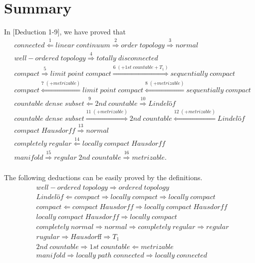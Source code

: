 \documentclass[11pt]{diazessay} %
\begin{document}

\section*{Summary}

In [Deduction 1-9], we have proved that
$$
\begin{aligned}
&	connected \overset{1}{\Longleftarrow} linear \; continuum \overset{2}{\Longrightarrow} order \; topology \overset{3}{\Longrightarrow} normal
\\
&	well-ordered \; topology \overset{4}{\Longrightarrow} totally \; disconnected
\\
&	compact \overset{5}{\Longrightarrow} limit \; point \; compact \overset{6\; (+1st\; countable + T_1)}{\Longrightarrow} sequentially \; compact 
\\
&	compact \overset{7\; (+metrizable)}{\Longleftarrow} limit \; point \; compact \overset{8\; (+metrizable)}{\Longleftarrow} sequentially \; compact 
\\
&	countable \; dense \; subset \overset{9}{\Longleftarrow} 2nd \; countable \overset{10}{\Longrightarrow} Lindel\textit{ö}f
\\
&	countable \; dense \; subset \overset{11\; (+metrizable)}{\Longrightarrow} 2nd \; countable \overset{12\; (+metrizable)}{\Longleftarrow} Lindel\textit{ö}f
\\
&	compact \; Hausdorff \overset{13}{\Longrightarrow} normal 
\\
&	completely \; regular \overset{14}{\Longleftarrow} locally \; compact \; Hausdorff
\\
&	manifold \overset{15}{\Longrightarrow} regular \; 2nd \; countable \overset{16}{\Longrightarrow} metrizable.\\
\end{aligned}
$$

\vskip 10pt
The following deductions can be easily proved by the definitions.
$$
\begin{aligned}
&well-ordered \; topology \overset{~}{\Longrightarrow} ordered \; topology\\
&Lindel\textit{ö}f \overset{~}{\Longleftarrow} compact \overset{~}{\Longrightarrow} locally \; compact \overset{~}{\Longrightarrow} locally \; compact\\
&compact \overset{~}{\Longleftarrow} compact \; Hausdorff \overset{~}{\Longrightarrow} locally \; compact \; Hausdorff \\
&locally \; compact \; Hausdorff \overset{~}{\Longrightarrow} locally \; compact\\
&completely \; normal \overset{~}{\Longrightarrow} normal \overset{~}{\Longrightarrow} completely \; regular \overset{~}{\Longrightarrow} regular\\
&rugular \overset{~}{\Longrightarrow} Hausdorﬀ \overset{~}{\Longrightarrow} T_1\\
&2nd \; countable \overset{~}{\Longrightarrow} 1st \; countable \overset{~}{\Longleftarrow} metrizable\\
&manifold \overset{~}{\Longrightarrow} locally \; path \; connected \overset{~}{\Longrightarrow} locally \; connected\\
\end{aligned}
$$
\end{document}
